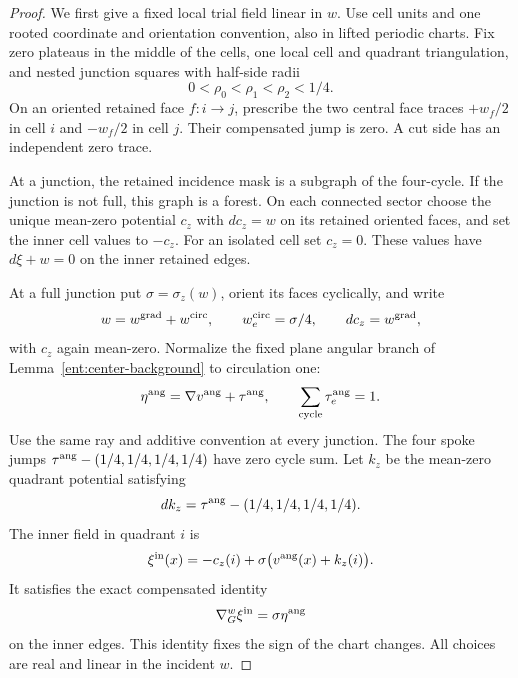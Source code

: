 \begin{proof}
We first give a fixed local trial field linear in \(w\).  Use cell
units and one rooted coordinate and orientation convention, also in
lifted periodic charts.  Fix zero plateaus in the middle of the
cells, one local cell and quadrant triangulation, and nested junction
squares with half-side radii
\[
                  0<\rho_0<\rho_1<\rho_2<1/4.
\]
On an oriented retained face \(f:i\to j\), prescribe the two central
face traces \(+w_f/2\) in cell \(i\) and \(-w_f/2\) in cell \(j\).
Their compensated jump is zero.  A cut side has an independent
zero trace.

At a junction, the retained incidence mask is a subgraph of the
four-cycle.  If the junction is not full, this graph is a forest.
On each connected sector choose the unique mean-zero potential
\(c_z\) with \(dc_z=w\) on its retained oriented faces, and set
the inner cell values to \(-c_z\).  For an isolated cell set
\(c_z=0\).  These values have \(d\xi+w=0\) on the inner retained
edges.

At a full junction put \(\sigma=\sigma_z(w)\), orient its faces
cyclically, and write
\[
       w=w^{\rm grad}+w^{\rm circ},\qquad
       w_e^{\rm circ}=\sigma/4,\qquad dc_z=w^{\rm grad},
\]
with \(c_z\) again mean-zero.  Normalize the fixed plane angular
branch of Lemma~\ref{ent:center-background} to circulation one:
\[
       \eta^{\rm ang}=\nabla v^{\rm ang}+\tau^{\rm ang},
       \qquad \sum_{\rm cycle}\tau_e^{\rm ang}=1.
\]
Use the same ray and additive convention at every junction.
The four spoke jumps
\(\tau^{\rm ang}-(1/4,1/4,1/4,1/4)\) have zero cycle sum.
Let \(k_z\) be the mean-zero quadrant potential satisfying
\[
       dk_z=\tau^{\rm ang}-(1/4,1/4,1/4,1/4).
\]
The inner
field in quadrant \(i\) is
\[
 \xi^{\rm in}(x)=-c_z(i)
                +\sigma\bigl(v^{\rm ang}(x)+k_z(i)\bigr).
\]
It satisfies the exact compensated identity
\[
                 \nabla_G^w\xi^{\rm in}=\sigma\eta^{\rm ang}
\]
on the inner edges.  This identity fixes the sign of the chart
changes.  All choices are real and linear in the incident \(w\).


\end{proof}
